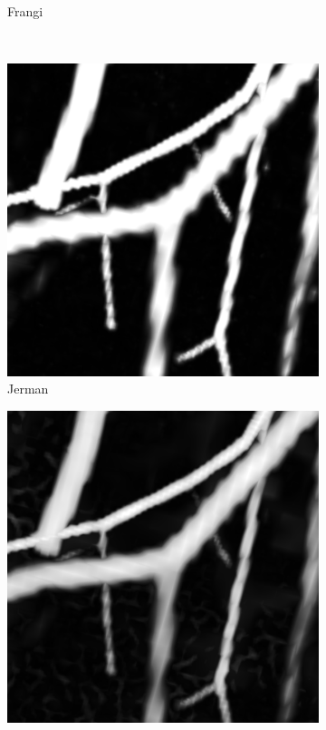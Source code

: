 \begin{figure}[!ht]
\begin{subfigure}[t]{0.30\textwidth}
      \caption{Frangi}
    \end{subfigure}
    \\
    \begin{subfigure}[t]{0.30\textwidth}
      \includegraphics[clip = true, trim  =  170 230 150 240, width=\textwidth]{Images/Vascu_2_k_Jerman.png}
      \caption{Jerman}
    \end{subfigure}
    \begin{subfigure}[t]{0.30\textwidth}
      \includegraphics[clip = true, trim  =  170 230 150 240, width=\textwidth]{Images/Vascu_2_k_OOF_GM.png}

\end{subfigure}
\end{figure}
